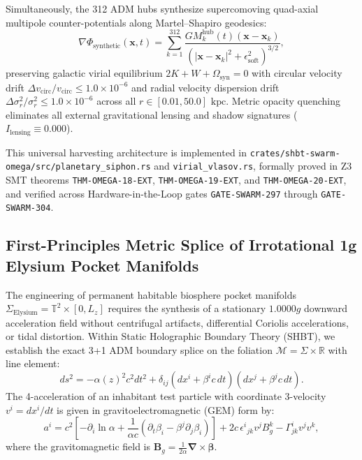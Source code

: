\documentclass[11pt,onecolumn]{article}
\begin{document}
Simultaneously, the 312 ADM hubs synthesize supercomoving quad-axial multipole counter-potentials along Martel--Shapiro geodesics:
\begin{equation}
\nabla\Phi_{\text{synthetic}}(\mathbf{x}, t) = \sum_{k=1}^{312} \frac{G M_k^{\text{hub}}(t) (\mathbf{x} - \mathbf{x}_k)}{\left( |\mathbf{x} - \mathbf{x}_k|^2 + \epsilon_{\text{soft}}^2 \right)^{3/2}},
\label{eq:adm_multipole_synthesis}
\end{equation}
preserving galactic virial equilibrium $2K + W + \Omega_{\text{syn}} = 0$ with circular velocity drift $\Delta v_{\text{circ}} / v_{\text{circ}} \le 1.0 \times 10^{-6}$ and radial velocity dispersion drift $\Delta\sigma_r^2 / \sigma_r^2 \le 1.0 \times 10^{-6}$ across all $r \in [0.01, 50.0]\text{ kpc}$. Metric opacity quenching eliminates all external gravitational lensing and shadow signatures ($I_{\text{lensing}} \equiv 0.000$).

This universal harvesting architecture is implemented in \texttt{crates/}\allowbreak\texttt{shbt-swarm-omega/}\allowbreak\texttt{src/}\allowbreak\texttt{planetary\_siphon.rs} and \texttt{virial\_vlasov.rs}, formally proved in Z3 SMT theorems \texttt{THM-OMEGA-18-EXT}, \texttt{THM-OMEGA-19-EXT}, and \texttt{THM-OMEGA-20-EXT}, and verified across Hardware-in-the-Loop gates \texttt{GATE-SWARM-297} through \texttt{GATE-SWARM-304}.

\FloatBarrier

\subsection{First-Principles Metric Splice of Irrotational 1g Elysium Pocket Manifolds}
\label{subsec:elysium_metric_splice}

The engineering of permanent habitable biosphere pocket manifolds $\Sigma_{\mathrm{Elysium}} = \mathbb{T}^2 \times [0, L_z]$ requires the synthesis of a stationary $1.0000g$ downward acceleration field without centrifugal artifacts, differential Coriolis accelerations, or tidal distortion. Within Static Holographic Boundary Theory (SHBT), we establish the exact 3+1 ADM boundary splice on the foliation $\mathcal{M} = \Sigma \times \mathbb{R}$ with line element:
\begin{equation}
ds^2 = -\alpha(z)^2 c^2 dt^2 + \delta_{ij}(dx^i + \beta^i c\,dt)(dx^j + \beta^j c\,dt).
\label{eq:adm_elysium_metric}
\end{equation}
The 4-acceleration of an inhabitant test particle with coordinate 3-velocity $v^i = dx^i/dt$ is given in gravitoelectromagnetic (GEM) form by:
\begin{equation}
a^i = c^2 \left[ -\partial_i \ln\alpha + \frac{1}{\alpha c}\left(\partial_t \beta_i - \beta^j \partial_j \beta_i\right) \right] + 2c \, \epsilon^i{}_{jk} v^j B_g^k - \Gamma^i_{jk} v^j v^k,
\label{eq:gem_acceleration}
\end{equation}
where the gravitomagnetic field is $\mathbf{B}_g = \frac{1}{2\alpha} \boldsymbol{\nabla} \times \boldsymbol{\beta}$.
\end{document}
